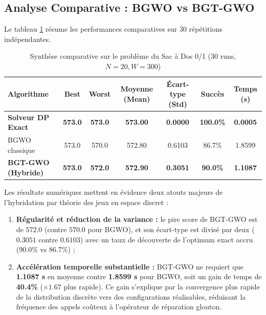 \subsection{Analyse Comparative : BGWO vs BGT-GWO}
Le tableau \ref{tab:knapsack_summary} résume les performances comparatives sur 30 répétitions indépendantes.

\begin{table}[h!]
    \centering
    \caption{Synthèse comparative sur le problème du Sac à Dos 0/1 (30 runs, $N=20, W=300$)}
    \label{tab:knapsack_summary}
    \small
    \begin{tabularx}{\textwidth}{lcccccc}
        \toprule
        \textbf{Algorithme} & \textbf{Best} & \textbf{Worst} & \textbf{Moyenne (Mean)} & \textbf{Écart-type (Std)} & \textbf{Succès} & \textbf{Temps (s)} \\
        \midrule
        \textbf{Solveur DP Exact} & \textbf{573.0} & \textbf{573.0} & \textbf{573.00} & \textbf{0.0000} & \textbf{100.0\%} & \textbf{0.0005} \\
        BGWO classique & 573.0 & 570.0 & 572.80 & 0.6103 & 86.7\% & 1.8599 \\
        \textbf{BGT-GWO (Hybride)} & \textbf{573.0} & \textbf{572.0} & \textbf{572.90} & \textbf{0.3051} & \textbf{90.0\%} & \textbf{1.1087} \\
        \bottomrule
    \end{tabularx}
\end{table}

Les résultats numériques mettent en évidence deux atouts majeurs de l'hybridation par théorie des jeux en espace discret :
\begin{enumerate}[label=\textbf{\alph*.}]
    \item \textbf{Régularité et réduction de la variance :} le pire score de BGT-GWO est de $572.0$ (contre $570.0$ pour BGWO), et son écart-type est divisé par deux ($0.3051$ contre $0.6103$) avec un taux de découverte de l'optimum exact accru (90.0\% vs 86.7\%) ;
    \item \textbf{Accélération temporelle substantielle :} BGT-GWO ne requiert que \textbf{1.1087 s} en moyenne contre \textbf{1.8599 s} pour BGWO, soit un gain de temps de \textbf{40.4\%} ($\times 1.67$ plus rapide). Ce gain s'explique par la convergence plus rapide de la distribution discrète vers des configurations réalisables, réduisant la fréquence des appels coûteux à l'opérateur de réparation glouton.
\end{enumerate}

